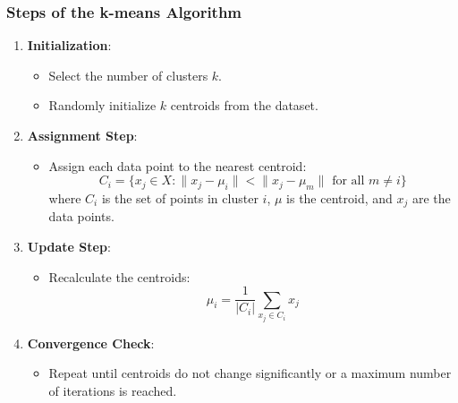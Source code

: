 \documentclass[aspectratio=169]{beamer}
\begin{document}
\begin{frame}[fragile]
    \frametitle{Steps of the k-means Algorithm}
    \begin{enumerate}
        \item \textbf{Initialization}:
            \begin{itemize}
                \item Select the number of clusters \( k \).
                \item Randomly initialize \( k \) centroids from the dataset.
            \end{itemize}
        
        \item \textbf{Assignment Step}:
            \begin{itemize}
                \item Assign each data point to the nearest centroid:
                \begin{equation}
                    C_i = \{x_j \in X : \|x_j - \mu_i\| < \|x_j - \mu_m\| \text{ for all } m \neq i\}
                \end{equation}
                where \( C_i \) is the set of points in cluster \( i \), \( \mu \) is the centroid, and \( x_j \) are the data points.
            \end{itemize}
        
        \item \textbf{Update Step}:
            \begin{itemize}
                \item Recalculate the centroids:
                \begin{equation}
                    \mu_i = \frac{1}{|C_i|} \sum_{x_j \in C_i} x_j
                \end{equation}
            \end{itemize}
        
        \item \textbf{Convergence Check}:
            \begin{itemize}
                \item Repeat until centroids do not change significantly or a maximum number of iterations is reached.
            \end{itemize}
    \end{enumerate}
\end{frame}
\end{document}

